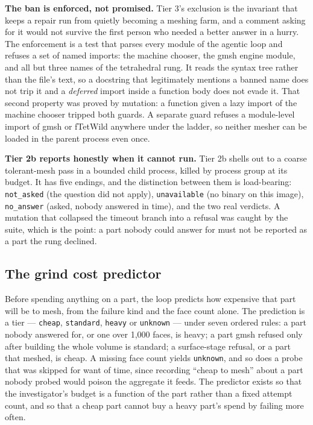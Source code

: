 \documentclass[10pt,onecolumn]{article}
\newcommand{\topic}[1]{\textbf{#1.}\hspace{0.5em}\ignorespaces}
\newcommand{\code}[1]{\texttt{\small #1}}
\begin{document}
\topic{The ban is enforced, not promised} Tier 3's exclusion is the invariant that keeps a repair
run from quietly becoming a meshing farm, and a comment asking for it would not survive the first
person who needed a better answer in a hurry. The enforcement is a test that parses every module of
the agentic loop and refuses a set of named imports: the machine chooser, the gmsh engine module,
and all but three names of the tetrahedral rung. It reads the syntax tree rather than the file's
text, so a docstring that legitimately mentions a banned name does not trip it and a \emph{deferred}
import inside a function body does not evade it. That second property was proved by mutation: a
function given a lazy import of the machine chooser tripped both guards. A separate guard refuses a
module-level import of gmsh or fTetWild anywhere under the ladder, so neither mesher can be loaded
in the parent process even once.

\topic{Tier 2b reports honestly when it cannot run} Tier 2b shells out to a coarse tolerant-mesh
pass in a bounded child process, killed by process group at its budget. It has five endings, and
the distinction between them is load-bearing: \code{not\_asked} (the question did not apply),
\code{unavailable} (no binary on this image), \code{no\_answer} (asked, nobody answered in time),
and the two real verdicts. A mutation that collapsed the timeout branch into a refusal was caught
by the suite, which is the point: a part nobody could answer for must not be reported as a part the
rung declined.

\subsection{The grind cost predictor}

Before spending anything on a part, the loop predicts how expensive that part will be to mesh, from
the failure kind and the face count alone. The prediction is a tier --- \code{cheap},
\code{standard}, \code{heavy} or \code{unknown} --- under seven ordered rules: a part nobody
answered for, or one over 1{,}000 faces, is heavy; a part gmsh refused only after building the
whole volume is standard; a surface-stage refusal, or a part that meshed, is cheap. A missing face
count yields \code{unknown}, and so does a probe that was skipped for want of time, since recording
``cheap to mesh'' about a part nobody probed would poison the aggregate it feeds. The predictor
exists so that the investigator's budget is a function of the part rather than a fixed attempt
count, and so that a cheap part cannot buy a heavy part's spend by failing more often.
\end{document}
